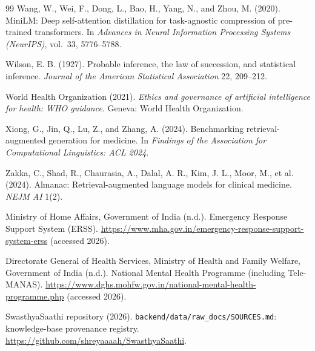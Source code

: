 \documentclass[10pt,a4paper]{article}
\newcommand{\code}[1]{\texttt{\small #1}}
\begin{document}
\begin{thebibliography}{99}
Wang, W., Wei, F., Dong, L., Bao, H., Yang, N., and Zhou, M. (2020). MiniLM: Deep self-attention distillation for task-agnostic compression of pre-trained transformers. In \emph{Advances in Neural Information Processing Systems (NeurIPS)}, vol.~33, 5776--5788.

Wilson, E. B. (1927). Probable inference, the law of succession, and statistical inference. \emph{Journal of the American Statistical Association} 22, 209--212.

World Health Organization (2021). \emph{Ethics and governance of artificial intelligence for health: WHO guidance}. Geneva: World Health Organization.

Xiong, G., Jin, Q., Lu, Z., and Zhang, A. (2024). Benchmarking retrieval-augmented generation for medicine. In \emph{Findings of the Association for Computational Linguistics: ACL 2024}.

Zakka, C., Shad, R., Chaurasia, A., Dalal, A. R., Kim, J. L., Moor, M., et al. (2024). Almanac: Retrieval-augmented language models for clinical medicine. \emph{NEJM AI} 1(2).

Ministry of Home Affairs, Government of India (n.d.). Emergency Response Support System (ERSS). \url{https://www.mha.gov.in/emergency-response-support-system-erss} (accessed 2026).

Directorate General of Health Services, Ministry of Health and Family Welfare, Government of India (n.d.). National Mental Health Programme (including Tele-MANAS). \url{https://www.dghs.mohfw.gov.in/national-mental-health-programme.php} (accessed 2026).

SwasthyaSaathi repository (2026). \code{backend/data/raw\_docs/SOURCES.md}: knowledge-base provenance registry. \url{https://github.com/shreyaaaah/SwasthyaSaathi}.

\end{thebibliography}

\appendix
\end{document}

